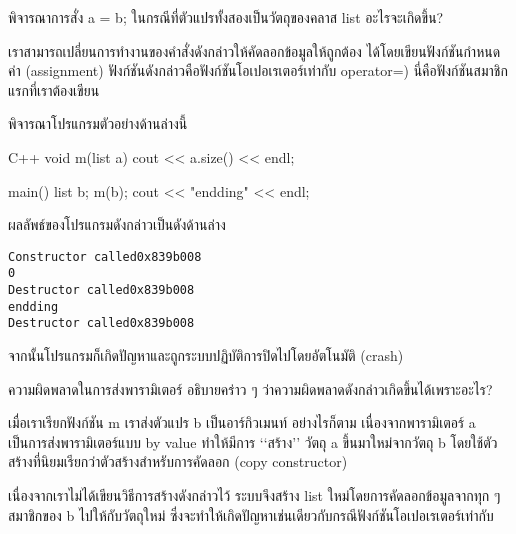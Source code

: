 \begin{quiz}{}
พิจารณา{\wbr}การ{\wbr}สั่ง {\ct a = b;} ใน{\wbr}กรณี{\wbr}ที่{\wbr}ตัวแปร{\wbr}ทั้ง{\wbr}สอง{\wbr}เป็น{\wbr}วัตถุ{\wbr}ของ{\wbr}ค{\wbr}ลา{\wbr}ส {\ct list}
อะไร{\wbr}จะ{\wbr}เกิด{\wbr}ขึ้น?
\end{quiz}

เรา{\wbr}สามารถ{\wbr}เปลี่ยน{\wbr}การ{\wbr}ทำงาน{\wbr}ของ{\wbr}คำสั่ง{\wbr}ดังกล่าว{\wbr}ให้{\wbr}คัดลอก{\wbr}ข้อมูล{\wbr}ให้{\wbr}ถูกต้อง{\wbr}
ได้{\wbr}โดย{\wbr}เขียน{\wbr}ฟังก์ชัน{\wbr}กำหนด{\wbr}ค่า (assignment) ฟังก์ชัน{\wbr}ดังกล่าว{\wbr}คือ{\wbr}ฟังก์ชัน{\wbr}โอ{\wbr}เปอเรเตอร์{\wbr}เท่า{\wbr}กับ{\wbr}
{\ct operator=}) นี่{\wbr}คือ{\wbr}ฟังก์ชัน{\wbr}สมาชิก{\wbr}แรก{\wbr}ที่{\wbr}เรา{\wbr}ต้อง{\wbr}เขียน{\wbr}

พิจารณา{\wbr}โปรแกรม{\wbr}ตัวอย่าง{\wbr}ด้าน{\wbr}ล่าง{\wbr}นี้{\wbr}

\latintext
\begin{codelist}{C++}{}
void m(list a) { cout << a.size() << endl; }

main()
{
  list b;
  m(b);
  cout << "endding" << endl;
}
\end{codelist}
\thaitext

ผลลัพธ์{\wbr}ของ{\wbr}โปรแกรม{\wbr}ดังกล่าว{\wbr}เป็น{\wbr}ดัง{\wbr}ด้าน{\wbr}ล่าง{\wbr}
{\latintext
\begin{verbatim}
Constructor called0x839b008
0
Destructor called0x839b008
endding
Destructor called0x839b008
\end{verbatim}
}
จากนั้น{\wbr}โปรแกรม{\wbr}ก็{\wbr}เกิด{\wbr}ปัญหา{\wbr}และ{\wbr}ถูก{\wbr}ระบบปฏิบัติการ{\wbr}ปิด{\wbr}ไป{\wbr}โดย{\wbr}อัตโนมัติ (crash)

\begin{quiz}{ความผิด{\wbr}พลาด{\wbr}ใน{\wbr}การ{\wbr}ส่ง{\wbr}พารามิเตอร์}
อธิบาย{\wbr}คร่าว ๆ ว่าความ{\wbr}ผิดพลาด{\wbr}ดังกล่าว{\wbr}เกิด{\wbr}ขึ้น{\wbr}ได้{\wbr}เพราะ{\wbr}อะไร?
\end{quiz}

เมื่อ{\wbr}เรา{\wbr}เรียก{\wbr}ฟังก์ชัน {\ct m} เรา{\wbr}ส่ง{\wbr}ตัวแปร {\ct b} เป็น{\wbr}อาร์กิวเมนท์ อย่างไรก็ตาม{\wbr}
เนื่องจาก{\wbr}พารามิเตอร์ {\ct a} เป็น{\wbr}การ{\wbr}ส่ง{\wbr}พารามิเตอร์{\wbr}แบบ by value ทำ{\wbr}ให้{\wbr}มี{\wbr}การ{\wbr}
`{\wbr}`{\wbr}สร้าง'' วัตถุ {\ct a} ขึ้น{\wbr}มา{\wbr}ใหม่{\wbr}จาก{\wbr}วัตถุ {\ct b}
โดย{\wbr}ใช้{\wbr}ตัว{\wbr}สร้าง{\wbr}ที่{\wbr}นิยม{\wbr}เรียก{\wbr}ว่า{\wbr}ตัว{\wbr}สร้าง{\wbr}สำหรับ{\wbr}การ{\wbr}คัดลอก (copy constructor)

เนื่องจาก{\wbr}เรา{\wbr}ไม่{\wbr}ได้{\wbr}เขียน{\wbr}วิธีการ{\wbr}สร้าง{\wbr}ดังกล่าว{\wbr}ไว้ ระบบ{\wbr}จึง{\wbr}สร้าง {\ct list}
ใหม่{\wbr}โดย{\wbr}การ{\wbr}คัดลอก{\wbr}ข้อมูล{\wbr}จาก{\wbr}ทุก ๆ สมาชิก{\wbr}ของ {\ct b} ไป{\wbr}ให้{\wbr}กับ{\wbr}วัตถุ{\wbr}ใหม่ 
ซึ่ง{\wbr}จะ{\wbr}ทำ{\wbr}ให้{\wbr}เกิด{\wbr}ปัญหา{\wbr}เช่นเดียวกับ{\wbr}กรณี{\wbr}ฟังก์ชัน{\wbr}โอ{\wbr}เปอเรเตอร์{\wbr}เท่า{\wbr}กับ{\wbr}

